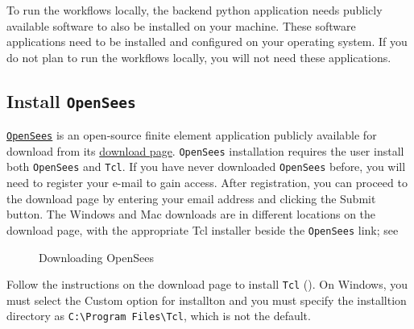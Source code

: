 To run the workflows locally, the backend python application needs
publicly available software to also be installed on your
machine. These software applications need to be installed and
configured on your operating system. If you do not plan to run the
workflows locally, you will not need these applications.

\subsection{Install \texttt{OpenSees}}

\href{http://opensees.berkeley.edu}{\texttt{OpenSees}} is an open-source finite element application publicly available for download from its \href{http://opensees.berkeley.edu/OpenSees/user/download.php}{download page}. \texttt{OpenSees} installation requires the user install both \texttt{OpenSees} and \texttt{Tcl}.  If you have never downloaded \texttt{OpenSees} before, you will need to register your e-mail to gain access. After registration, you can proceed to the download page by entering your email address and clicking the Submit button. The Windows and Mac downloads are in different locations on the download page, with the appropriate Tcl installer beside the \texttt{OpenSees} link; see 

\begin{figure}[!htbp]
  \caption{Downloading OpenSees}
  \label{fig:openseesDownload}
\end{figure}

Follow the instructions on the download page to install \texttt{Tcl}
(). On Windows, you must select the Custom option for installton and you must specify
the installtion directory as \texttt{C:\textbackslash Program Files\textbackslash Tcl}, 
which is not the default. \\

